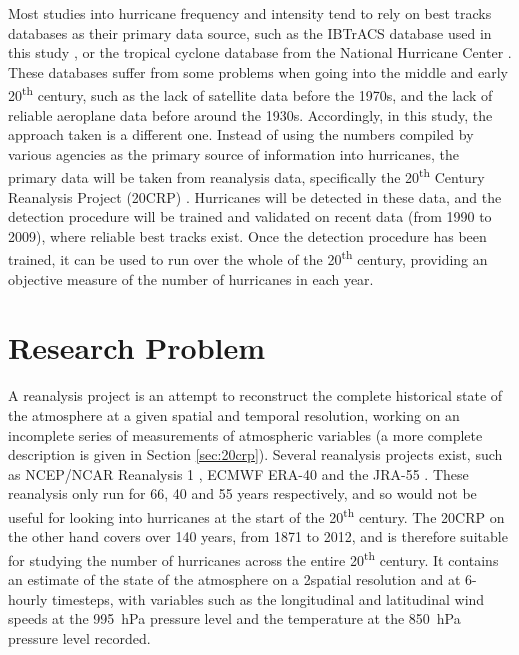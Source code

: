 \documentclass[pdftex,12pt,a4paper]{report}
\newcommand{\ts}{\textsuperscript}
\begin{document}
Most studies into hurricane frequency and intensity tend to rely on best tracks databases as their
primary data source, such as the IBTrACS database used in this study
\parencite{knappInternational2010}, or the tropical cyclone database from the National Hurricane
Center \parencite{jarvinianTropical1984}. These databases suffer from some problems when going into
the middle and early 20\ts{th} century, such as the lack of satellite data before the 1970s, and the
lack of reliable aeroplane data before around the 1930s. Accordingly, in this study, the approach
taken is a different one. Instead of using the numbers compiled by various agencies as the primary
source of information into hurricanes, the primary data will be taken from reanalysis data,
specifically the 20\ts{th} Century Reanalysis Project (20CRP) \parencite{compoTwentieth2011}.
Hurricanes will be detected in these data, and the detection procedure will be trained and validated
on recent data (from 1990 to 2009), where reliable best tracks exist. Once the detection procedure
has been trained, it can be used to run over the whole of the 20\ts{th} century, providing an
objective measure of the number of hurricanes in each year.

\section{Research Problem}


A reanalysis project is an attempt to reconstruct the complete historical state of the atmosphere at
a given spatial and temporal resolution, working on an incomplete series of measurements of
atmospheric variables (a more complete description is given in Section \ref{sec:20crp}). Several
reanalysis projects exist, such as NCEP/NCAR Reanalysis 1 \parencite{TODOCITE}, ECMWF ERA-40
\parencite{uppalaEra2006} and the JRA-55 \parencite{TODOCITE}. These reanalysis only run for 66, 40
and 55 years respectively, and so would not be useful for looking into hurricanes at the start of
the 20\ts{th} century. The 20CRP on the other hand covers over 140 years, from 1871 to 2012, and is
therefore suitable for studying the number of hurricanes across the entire 20\ts{th} century.  It
contains an estimate of the state of the atmosphere on a 2\textdegree spatial resolution and at
6-hourly timesteps, with variables such as the longitudinal and latitudinal wind speeds at the
\SI{995}{hPa} pressure level and the temperature at the \SI{850}{hPa} pressure level recorded.
\end{document}
